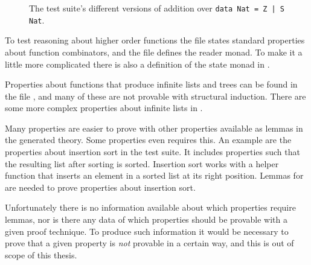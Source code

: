\begin{figure}[h!]
\centering
{}\hspace{10pt}
\hspace{10pt}

\hspace{10pt}
\hspace{10pt}

\hspace{10pt}
\hspace{10pt}
\caption{The test suite's different versions of addition over \texttt{data Nat = Z | S Nat}.
\label{code:natadd}
}
\end{figure}

To test reasoning about higher order functions the file 
states standard properties about function combinators, and the file
 defines the reader monad. To make it a little more
complicated there is also a definition of the state monad in
.

Properties about functions that produce infinite lists and trees can
be found in the file , and many of these are not provable
with structural induction. There are some more complex properties
about infinite lists in .

Many properties are easier to prove with other properties available as
lemmas in the generated theory. Some properties even requires this. An
example are the properties about insertion sort in the test suite. It
includes properties such that the resulting list after sorting is
sorted. Insertion sort works with a helper function  that
inserts an element in a sorted list at its right position. Lemmas
for  are needed to prove properties about insertion sort.

Unfortunately there is no information available about which properties
require lemmas, nor is there any data of which properties should be
provable with a given proof technique. To produce such information it
would be necessary to prove that a given property is \emph{not}
provable in a certain way, and this is out of scope of this thesis.


